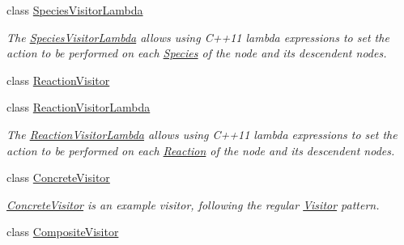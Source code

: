 \begin{DoxyCompactItemize}
class \hyperlink{classchem_1_1SpeciesVisitorLambda}{Species\-Visitor\-Lambda}
\begin{DoxyCompactList}\small\item\em The \hyperlink{classchem_1_1SpeciesVisitorLambda}{Species\-Visitor\-Lambda} allows using C++11 lambda expressions to set the action to be performed on each \hyperlink{classchem_1_1Species}{Species} of the node and its descendent nodes. \end{DoxyCompactList}\item 
class \hyperlink{classchem_1_1ReactionVisitor}{Reaction\-Visitor}
\item 
class \hyperlink{classchem_1_1ReactionVisitorLambda}{Reaction\-Visitor\-Lambda}
\begin{DoxyCompactList}\small\item\em The \hyperlink{classchem_1_1ReactionVisitorLambda}{Reaction\-Visitor\-Lambda} allows using C++11 lambda expressions to set the action to be performed on each \hyperlink{classchem_1_1Reaction}{Reaction} of the node and its descendent nodes. \end{DoxyCompactList}\item 
class \hyperlink{classchem_1_1ConcreteVisitor}{Concrete\-Visitor}
\begin{DoxyCompactList}\small\item\em \hyperlink{classchem_1_1ConcreteVisitor}{Concrete\-Visitor} is an example visitor, following the regular \hyperlink{classchem_1_1Visitor}{Visitor} pattern. \end{DoxyCompactList}\item 
class \hyperlink{classchem_1_1CompositeVisitor}{Composite\-Visitor}
\end{DoxyCompactItemize}
